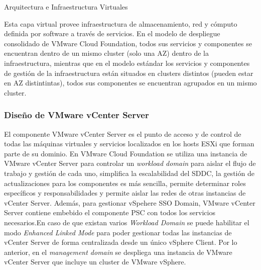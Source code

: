 \begin{subsection}{Arquitectura e Infraestructura Virtuales\cite{CFVirtInfraes}}

Esta capa virtual provee infraestructura de almacenamiento, red y cómputo definida por software a través de servicios. En el modelo de despliegue consolidado de VMware Cloud Foundation, todos sus servicios y componentes se encuentran dentro de un mismo cluster (solo una AZ) dentro de la infraestructura, mientras que en el modelo estándar los servicios y componentes de gestión de la infraestructura están situados en clusters distintos (pueden estar en AZ distintintas), todos sus componentes se encuentran agrupados en un mismo cluster.



\subsubsection{Diseño de VMware vCenter Server}
El componente VMware vCenter Server es el punto de acceso y de control de todas las máquinas virtuales y servicios localizados en los hosts ESXi que forman parte de su dominio. En VMware Cloud Foundation se utiliza una instancia de VMware vCenter Server para controlar un \textit{workload domain} para aislar el flujo de trabajo y gestión de cada uno, simplifica la escalabilidad del SDDC, la gestión de actualizaciones para los componentes es más sencilla, permite determinar roles específicos y responsabilidades y permite aislar las redes de otras instancias de vCenter Server. Además, para gestionar vSpehere SSO Domain, VMware vCenter Server contiene embebido el componente PSC con todos los servicios necesarios.En caso de que existan varios \textit{Workload Domain} se puede habilitar el modo \textit{Enhanced Linked Mode} para poder gestionar todas las instancias de vCenter Server de forma centralizada desde un único vSphere Client.
Por lo anterior, en el \textit{management domain} se despliega una instancia de VMware vCenter Server que incluye un cluster de VMware vSphere.




\end{subsection}
